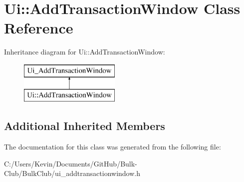 \hypertarget{class_ui_1_1_add_transaction_window}{}\section{Ui\+:\+:Add\+Transaction\+Window Class Reference}
\label{class_ui_1_1_add_transaction_window}
Inheritance diagram for Ui\+:\+:Add\+Transaction\+Window\+:\begin{figure}[H]
\begin{center}
\leavevmode
\includegraphics[height=2.000000cm]{class_ui_1_1_add_transaction_window}
\end{center}
\end{figure}
\subsection*{Additional Inherited Members}


The documentation for this class was generated from the following file\+:\begin{DoxyCompactItemize}
\item 
C\+:/\+Users/\+Kevin/\+Documents/\+Git\+Hub/\+Bulk-\/\+Club/\+Bulk\+Club/ui\+\_\+addtransactionwindow.\+h\end{DoxyCompactItemize}
